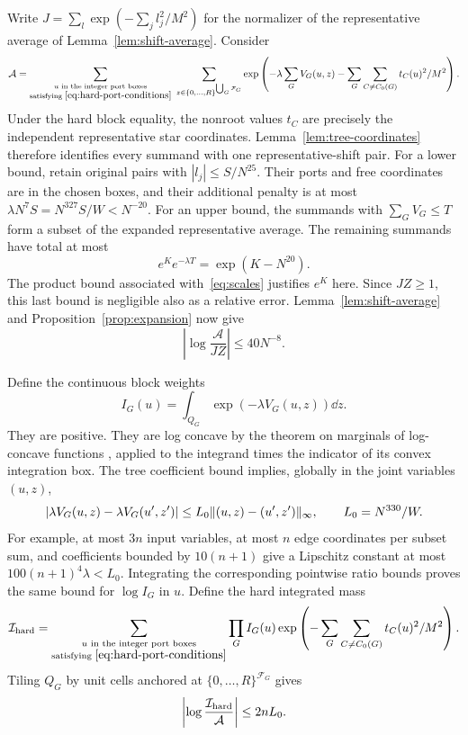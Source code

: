 Write $J=\sum_l\exp(-\sum_jl_j^2/M^2)$ for the normalizer of the
representative average of Lemma~\ref{lem:shift-average}. Consider
\begin{equation}\label{eq:discrete-port-sum}
 \mathcal A=\sum_{\substack{u\text{ in the integer port boxes}\\
                          \text{satisfying }\eqref{eq:hard-port-conditions}}}
 \ \sum_{z\in\{0,\ldots,R\}^{\bigcup_G\mathcal F_G}}
 \exp\left(-\lambda\sum_GV_G(u,z)
           -\sum_G\sum_{C\ne C_0(G)}t_C(u)^2/M^2\right).
\end{equation}
Under the hard block equality, the nonroot values $t_C$ are precisely
the independent representative star coordinates. Lemma~\ref{lem:tree-coordinates}
therefore identifies every summand with one representative-shift pair.
For a lower bound, retain original pairs with $|l_j|\le S/N^{25}$.
Their ports and free coordinates are in the chosen boxes, and their
additional penalty is at most
$\lambda N^7S=N^{327}S/W<N^{-20}$.
For an upper bound, the summands with $\sum_GV_G\le T$ form a subset
of the expanded representative average. The remaining summands have
total at most
\[
 e^K e^{-\lambda T}=\exp(K-N^{20}).
\]
The product bound associated with~\eqref{eq:scales} justifies $e^K$
here. Since $JZ\ge1$, this last bound is negligible also as a relative
error. Lemma~\ref{lem:shift-average} and
Proposition~\ref{prop:expansion} now give
\begin{equation}\label{eq:discrete-proxy-bound}
 \left|\log\frac{\mathcal A}{JZ}\right|\le40N^{-8}.
\end{equation}

Define the continuous block weights
\begin{equation}\label{eq:block-integral}
 I_G(u)=\int_{Q_G}\exp(-\lambda V_G(u,z))\dd z.
\end{equation}
They are positive. They are log concave by the theorem on marginals
of log-concave functions \cite{Prekopa1973}, applied to the integrand
times the indicator of its convex integration box. The tree coefficient
bound implies, globally in the joint variables $(u,z)$,
\begin{equation}\label{eq:port-lipschitz}
 |\lambda V_G(u,z)-\lambda V_G(u',z')|
 \le L_0\lVert(u,z)-(u',z')\rVert_\infty,
 \qquad L_0=N^{330}/W.
\end{equation}
For example, at most $3n$ input variables, at most $n$ edge coordinates
per subset sum, and coefficients bounded by $10(n+1)$ give a Lipschitz
constant at most $100(n+1)^4\lambda<L_0$.
Integrating the corresponding pointwise ratio bounds proves the same
bound for $\log I_G$ in $u$. Define the hard integrated mass
\[
 \mathcal I_{\rm hard}
 =\sum_{\substack{u\text{ in the integer port boxes}\\
                    \text{satisfying }\eqref{eq:hard-port-conditions}}}
       \prod_G I_G(u)
       \exp\left(-\sum_G\sum_{C\ne C_0(G)}t_C(u)^2/M^2\right).
\]
Tiling $Q_G$ by unit cells anchored at
$\{0,\ldots,R\}^{\mathcal F_G}$ gives
\begin{equation}\label{eq:sum-integral-comparison}
 \left|\log\frac{\mathcal I_{\rm hard}}{\mathcal A}\right|\le2nL_0.
\end{equation}

